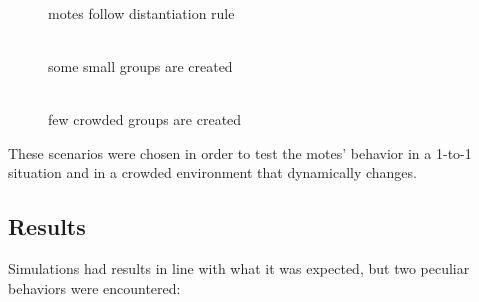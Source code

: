 \documentclass[11pt]{article}
\begin{document}
\begin{figure}[H]
  \centering
  \begin{minipage}{0.32\textwidth}
    \centering
    \caption{\\motes follow distantiation rule}
    \label{distantiation}
    
  \end{minipage}
  \begin{minipage}{0.32\textwidth}
    \centering
    \caption{\\some small groups are created}
    \label{small-groups}
    
  \end{minipage}
  \begin{minipage}{0.32\textwidth}
    \centering
    \caption{\\few crowded groups are created}
    \label{crowded-groups}
    
  \end{minipage}
\end{figure}

These scenarios were chosen in order to test the motes' behavior in a 1-to-1 situation and in a crowded environment that dynamically changes.

\subsection{Results}
Simulations had results in line with what it was expected, but two peculiar behaviors were encountered:
\end{document}
